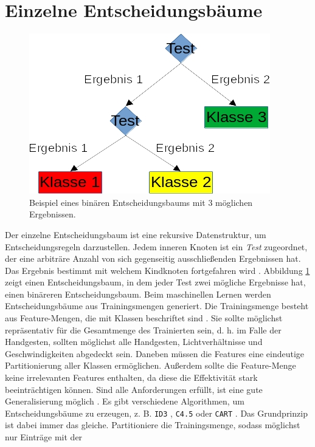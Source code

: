 \section{Einzelne Entscheidungsbäume}
\label{sec:construction}
\begin{figure}
    \centering
    \includegraphics[width=0.5\linewidth]{images/entscheidungsbaum.jpg}
    \caption{Beispiel eines binären Entscheidungsbaums mit 3 möglichen Ergebnissen.}
    \label{fig:entscheidungsbaum}
\end{figure}
Der einzelne Entscheidungsbaum ist eine rekursive Datenstruktur, um Entscheidungsregeln darzustellen. Jedem inneren Knoten ist ein \textit{Test} zugeordnet, der eine arbiträre Anzahl von sich gegenseitig
ausschließenden Ergebnissen hat. Das Ergebnis bestimmt mit welchem Kindknoten fortgefahren wird \cite{quinlan1990decision}. Abbildung \ref{fig:entscheidungsbaum} zeigt einen Entscheidungsbaum, in dem jeder Test
zwei mögliche Ergebnisse hat, einen binäreren Entscheidungsbaum.
\newline
\newline
Beim maschinellen Lernen werden Entscheidungsbäume aus Trainingsmengen generiert. Die Trainingsmenge besteht aus Feature-Mengen, die mit Klassen beschriftet sind \cite{steinbergCART}. Sie sollte möglichst repräsentativ
für die Gesamtmenge des Trainierten sein, d. h. im Falle der Handgesten, sollten möglichst alle Handgesten, Lichtverhältnisse und Geschwindigkeiten abgedeckt sein. Daneben müssen die Features eine eindeutige
Partitionierung aller Klassen ermöglichen. Außerdem sollte die Feature-Menge keine irrelevanten Features enthalten, da diese die Effektivität stark beeinträchtigen können. Sind alle Anforderungen erfüllt, ist eine
gute Generalisierung möglich \cite{pei1998feature}.
\newline
\newline
Es gibt verschiedene Algorithmen, um Entscheidungsbäume zu erzeugen, z. B. \texttt{ID3} \cite{quinlan1986induction}, \texttt{C4.5} \cite{quinlan2014c4}
oder \texttt{CART} \cite{breiman1984classification}. Das Grundprinzip ist dabei immer das gleiche. Partitioniere die Trainingsmenge, sodass möglichst nur Einträge mit der
